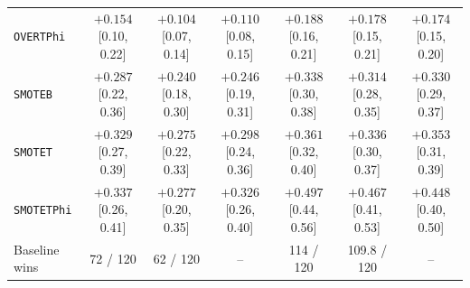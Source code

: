 \begin{table}[t]
{{\begin{tabular}{lcccccc}
\texttt{OVERTPhi} & $+0.154$ {\scriptsize[0.10, 0.22]} & $+0.104$ {\scriptsize[0.07, 0.14]} & $+0.110$ {\scriptsize[0.08, 0.15]} & $+0.188$ {\scriptsize[0.16, 0.21]} & $+0.178$ {\scriptsize[0.15, 0.21]} & $+0.174$ {\scriptsize[0.15, 0.20]} \\
\texttt{SMOTEB} & $+0.287$ {\scriptsize[0.22, 0.36]} & $+0.240$ {\scriptsize[0.18, 0.30]} & $+0.246$ {\scriptsize[0.19, 0.31]} & $+0.338$ {\scriptsize[0.30, 0.38]} & $+0.314$ {\scriptsize[0.28, 0.35]} & $+0.330$ {\scriptsize[0.29, 0.37]} \\
\texttt{SMOTET} & $+0.329$ {\scriptsize[0.27, 0.39]} & $+0.275$ {\scriptsize[0.22, 0.33]} & $+0.298$ {\scriptsize[0.24, 0.36]} & $+0.361$ {\scriptsize[0.32, 0.40]} & $+0.336$ {\scriptsize[0.30, 0.37]} & $+0.353$ {\scriptsize[0.31, 0.39]} \\
\texttt{SMOTETPhi} & $+0.337$ {\scriptsize[0.26, 0.41]} & $+0.277$ {\scriptsize[0.20, 0.35]} & $+0.326$ {\scriptsize[0.26, 0.40]} & $+0.497$ {\scriptsize[0.44, 0.56]} & $+0.467$ {\scriptsize[0.41, 0.53]} & $+0.448$ {\scriptsize[0.40, 0.50]} \\
\midrule
Baseline wins & 72 / 120 & 62 / 120 & -- & 114 / 120 & 109.8 / 120 & -- \\
\bottomrule
\end{tabular}%
}%
}
\end{table}
